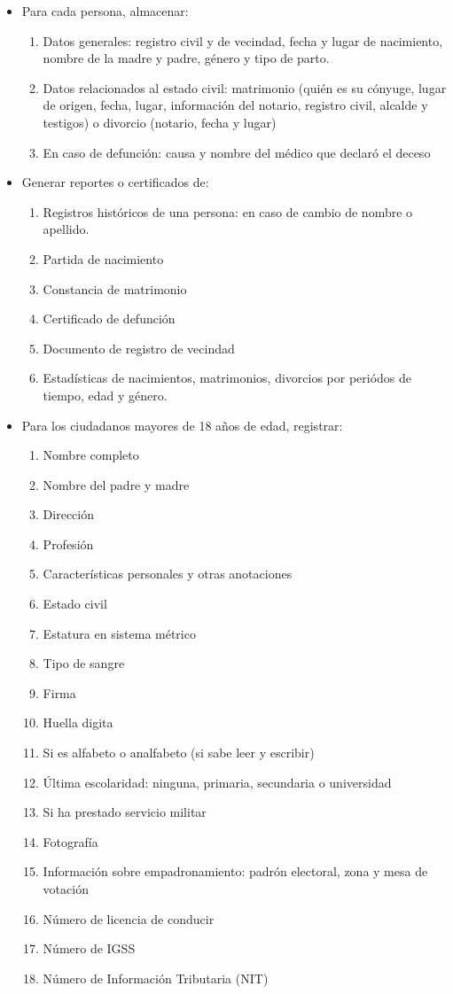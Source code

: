 \begin{itemize}
\item Para cada persona, almacenar:
	\begin{enumerate} 
	\item Datos generales: registro civil y de vecindad, fecha y lugar de nacimiento, nombre de la madre y padre, g\'{e}nero y tipo de parto.
	\item Datos relacionados al estado civil: matrimonio (qui\'{e}n es su c\'{o}nyuge, lugar de origen, fecha, lugar, informaci\'{o}n del notario, registro civil, alcalde y testigos) o divorcio (notario, fecha y lugar)
	\item En caso de defunci\'{o}n: causa y nombre del m\'{e}dico que declar\'{o} el deceso
	\end{enumerate}
\item Generar reportes o certificados de:
	\begin{enumerate}
	\item Registros hist\'{o}ricos de una persona: en caso de cambio de nombre o apellido.
	\item Partida de nacimiento
	\item Constancia de matrimonio
	\item Certificado de defunci\'{o}n
	\item Documento de registro de vecindad
	\item Estad\'{i}sticas de nacimientos, matrimonios, divorcios por peri\'{o}dos de tiempo, edad y g\'{e}nero.
	\end{enumerate}
\item Para los ciudadanos mayores de 18 a\~{n}os de edad, registrar:
	\begin{enumerate}
	\item Nombre completo
	\item Nombre del padre y madre
	\item Direcci\'{o}n
	\item Profesi\'{o}n
	\item Caracter\'{i}sticas personales y otras anotaciones
	\item Estado civil
	\item Estatura en sistema m\'{e}trico 
	\item Tipo de sangre
	\item Firma
	\item Huella digita
	\item Si es alfabeto o analfabeto (si sabe leer y escribir)
	\item \'{U}ltima escolaridad: ninguna, primaria, secundaria o universidad
	\item Si ha prestado servicio militar 
	\item Fotograf\'{i}a
	\item Informaci\'{o}n sobre empadronamiento: padr\'{o}n electoral, zona y mesa  de votaci\'{o}n
	\item N\'{u}mero de licencia de conducir
	\item N\'{u}mero de IGSS
	\item N\'{u}mero de Informaci\'{o}n Tributaria (NIT)
	\end{enumerate}
\end{itemize}

